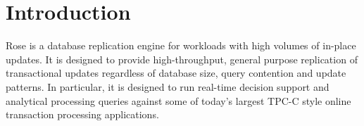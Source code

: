 \documentclass{vldb}
\newcommand{\rows}{Rose\xspace}
\newcommand{\rowss}{Rose's\xspace}
\begin{document}
\begin{abstract}
\rows avoids random I/O during replication and scans, providing more
I/O capacity for queries than existing systems.  This increases
scalability of real-time replication of seek-bound workloads.
Benchmarks and analytical models show that \rows provides orders of
magnitude greater replication bandwidth and database sizes than conventional
techniques.





\end{abstract}





\section{Introduction}

\rows is a database replication engine for workloads with high volumes
of in-place updates.  It is designed to provide high-throughput,
general purpose replication of transactional updates regardless of
database size, query contention and update patterns.  In particular, it
is designed to run real-time decision support and analytical
processing queries against some of today's largest TPC-C style online
transaction processing applications.
\end{document}
